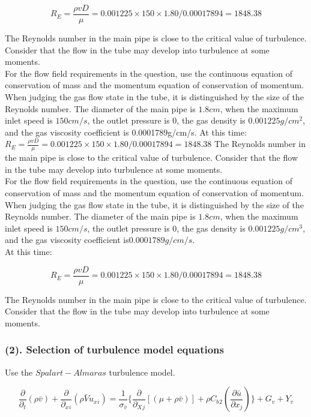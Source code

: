 \documentclass[
]{article}
\begin{document}
\[R _E = \frac{\rho v D}{\mu}=0.001225 \times 150 \times 1.80 /0.00017894 = 1848.38\]

The Reynolds number in the main pipe is close to the critical value of
turbulence. Consider that the flow in the tube may develop into
turbulence at some moments.\\
For the flow field requirements in the question, use the continuous
equation of conservation of mass and the momentum equation of
conservation of momentum. When judging the gas flow state in the tube,
it is distinguished by the size of the Reynolds number. The diameter of
the main pipe is \(1.8cm\), when the maximum inlet speed is \(150cm/s\),
the outlet pressure is 0, the gas density is \(0.001225g/cm ^2\), and
the gas viscosity coefficient is 0.0001789g/cm/s. At this time:
\(R _E = \frac{\rho v D}{\mu}=0.001225 \times 150 \times 1.80 /0.00017894 = 1848.38\)
The Reynolds number in the main pipe is close to the critical value of
turbulence. Consider that the flow in the tube may develop into
turbulence at some moments.\\
For the flow field requirements in the question, use the continuous
equation of conservation of mass and the momentum equation of
conservation of momentum. When judging the gas flow state in the tube,
it is distinguished by the size of the Reynolds number. The diameter of
the main pipe is \(1.8cm\), when the maximum inlet speed is \(150cm/s\),
the outlet pressure is \(0\), the gas density is \(0.001225g/cm ^3\),
and the gas viscosity coefficient is\(0.0001789g/cm/s\).\\
At this time:

\[R _E = \frac{\rho v D}{\mu}=0.001225 \times 150 \times 1.80 /0.00017894 = 1848.38\]

The Reynolds number in the main pipe is close to the critical value of
turbulence. Consider that the flow in the tube may develop into
turbulence at some moments.

\hypertarget{2-selection-of-turbulence-model-equations}{%
\subsubsection{\texorpdfstring{(2). Selection of turbulence model
equations
}{(2). Selection of turbulence model equations }}\label{2-selection-of-turbulence-model-equations}}

Use the \(Spalart-Almaras\) turbulence model.

\[\frac{\partial}{\partial _t}(\rho \bar{v}) + \frac{\partial}{\partial _x{_i}}(\rho \bar{V} u _x{_i} )=\frac{1}{\sigma _{\bar{v}}}\{{\frac{\partial}{\partial _X{_j}}}[(\mu + \rho \bar{v}) ]+\rho C_b{_2}(\frac{\partial \bar{u}}{\partial x _j})\}+G _v + Y _v\]
\end{document}
